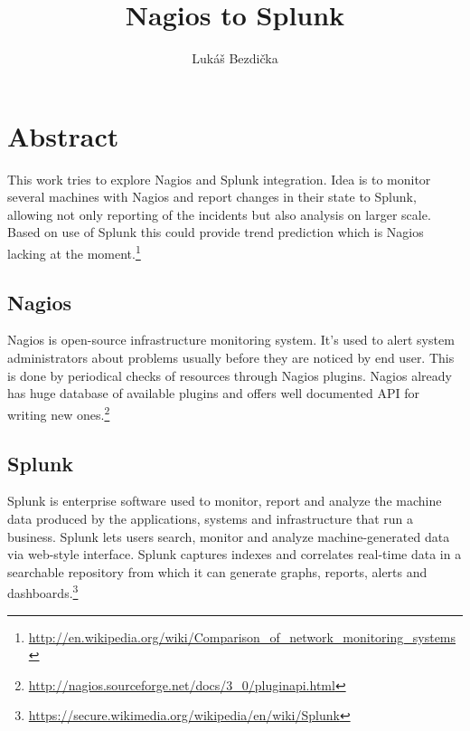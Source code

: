 \documentclass[10pt,a4paper,final]{report}
\author{Lukáš Bezdička}
\title{Nagios to Splunk}
\begin{document}
\setcounter{page}{1}

\chapter*{Abstract}
This work tries to explore Nagios and Splunk integration. Idea is to monitor several machines with Nagios and report changes in their state to Splunk, allowing not only reporting of the incidents but also analysis on larger scale. Based on use of Splunk this could provide trend prediction which is Nagios lacking at the moment.\footnote{\url{http://en.wikipedia.org/wiki/Comparison\_of\_network\_monitoring\_systems}}

\section*{Nagios}

Nagios is open-source infrastructure monitoring system. It's used to alert system administrators about problems usually before they are noticed by end user. This is done by periodical checks of resources through Nagios plugins. Nagios already has huge database of available plugins and offers well documented API for writing new ones.\footnote{\url{http://nagios.sourceforge.net/docs/3\_0/pluginapi.html}}

\section*{Splunk}
Splunk is enterprise software used to monitor, report and analyze the machine data produced by the applications, systems and infrastructure that run a business. Splunk lets users search, monitor and analyze machine-generated data via web-style interface. Splunk captures indexes and correlates real-time data in a searchable repository from which it can generate graphs, reports, alerts and dashboards.\footnote{\url{https://secure.wikimedia.org/wikipedia/en/wiki/Splunk}}
\newpage

\setcounter{tocdepth}{3}
\setcounter{page}{1}
\tableofcontents
\end{document}
